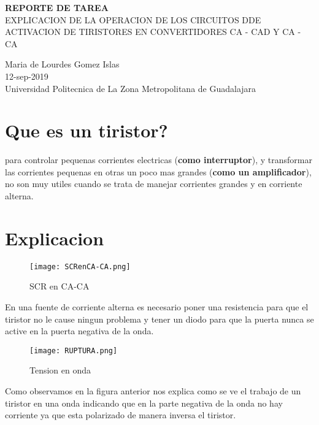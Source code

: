 \documentclass[11pt,a4paper]{article}
\author{Maria de Lourdes Gomez}
\begin{document}
\begin{center}
\textbf{REPORTE DE TAREA}\\
EXPLICACION DE LA OPERACION DE LOS CIRCUITOS DDE ACTIVACION DE TIRISTORES EN CONVERTIDORES CA - CAD Y CA - CA
\end{center}

\begin{center}
Maria de Lourdes Gomez Islas\\
12-sep-2019\\
Universidad Politecnica de La Zona Metropolitana de Guadalajara
\end{center}

\section{Que es un tiristor?}
para controlar pequenas corrientes electricas (\textbf{como interruptor}), y transformar las corrientes pequenas en otras un poco mas grandes (\textbf{como un amplificador}), no son muy utiles cuando se trata de manejar corrientes grandes y en corriente alterna.

\section{Explicacion}

\begin{figure}[h]
\centering
\texttt{[image: SCRenCA-CA.png]} 
\caption{SCR en CA-CA}
\end{figure}

En una fuente de corriente alterna es necesario poner una resistencia para que el tiristor no le cause ningun problema y tener un diodo para que la puerta nunca se active en la puerta negativa de la onda.

\begin{figure}[h]
\centering
\texttt{[image: RUPTURA.png]} 
\caption{Tension en onda}
\end{figure}

Como observamos en la figura anterior nos explica como se ve el trabajo de un tiristor en una onda indicando que en la parte negativa de la onda no hay corriente ya que esta polarizado de manera inversa el tiristor.
\end{document}
